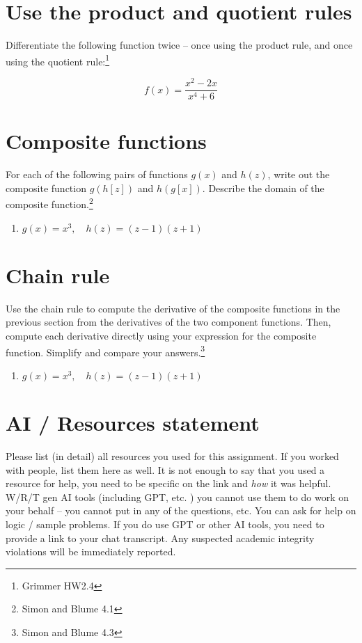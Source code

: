 \documentclass[
  letterpaper,
  DIV=11,
  numbers=noendperiod]{scrartcl}
\begin{document}
\hypertarget{use-the-product-and-quotient-rules}{%
\section{Use the product and quotient
rules}\label{use-the-product-and-quotient-rules}}

Differentiate the following function twice -- once using the product
rule, and once using the quotient rule:\footnote{Grimmer HW2.4}

\[f(x) = \dfrac{x^2-2x}{x^4 + 6}\]

\hypertarget{composite-functions}{%
\section{Composite functions}\label{composite-functions}}

For each of the following pairs of functions \(g(x)\) and \(h(z)\),
write out the composite function \(g(h[z])\) and \(h(g[x])\). Describe
the domain of the composite function.\footnote{Simon and Blume 4.1}

\begin{enumerate}
\def\labelenumi{\alph{enumi}.}
\item
  \(g(x) = x^3, \quad h(z) = (z - 1)(z + 1)\)
\end{enumerate}

\hypertarget{chain-rule}{%
\section{Chain rule}\label{chain-rule}}

Use the chain rule to compute the derivative of the composite functions
in the previous section from the derivatives of the two component
functions. Then, compute each derivative directly using your expression
for the composite function. Simplify and compare your
answers.\footnote{Simon and Blume 4.3}

\begin{enumerate}
\def\labelenumi{\alph{enumi}.}
\item
  \(g(x) = x^3, \quad h(z) = (z - 1)(z + 1)\)
\end{enumerate}

\hypertarget{ai-resources-statement}{%
\section{AI / Resources statement}\label{ai-resources-statement}}

Please list (in detail) all resources you used for this assignment. If
you worked with people, list them here as well. It is not enough to say
that you used a resource for help, you need to be specific on the link
and \emph{how} it was helpful. W/R/T gen AI tools (including GPT, etc. )
you cannot use them to do work on your behalf -- you cannot put in any
of the questions, etc. You can ask for help on logic / sample problems.
If you do use GPT or other AI tools, you need to provide a link to your
chat transcript. Any suspected academic integrity violations will be
immediately reported.
\end{document}
